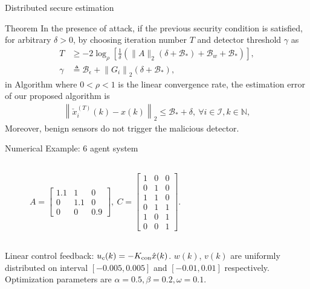 \documentclass[10pt]{beamer}
\newcommand{\Bc}{{\mathcal B}}
\newcommand{\Ica}{{\mathcal I}}
\newcommand{\Nb}{{\mathbb N}}
\newcommand{\cx}{{\check{x}}}
\begin{document}
\begin{frame}{Distributed secure estimation}

	\begin{block}{Theorem}
	In the presence of attack, if the previous security condition is satisfied, for arbitrary $\delta>0$, by choosing iteration number $T$ and detector threshold $\gamma$ as 
	\begin{align}
		T&\geq -2\log_{\rho}\left[ \frac{1}{\delta} \left( \|A\|_2(\delta+\Bc_{*})+\Bc_{w}+ \Bc_{*} \right)\right], \label{eq:chooseT}\\
		\gamma&\triangleq\Bc_\epsilon + \left\|G_i\right\|_2 (\delta+\Bc_{*}), \label{eq:choose_gamma}
	\end{align}
	in Algorithm where $0<\rho<1$ is the linear convergence rate, the estimation error of our proposed algorithm is
	\begin{align*}
		\left\|\cx_i^{(T)}(k)-x(k)\right\|_2 \leq \Bc_{*}+\delta, \ \forall i\in\Ica, k\in\Nb,
	\end{align*}
	Moreover, benign sensors do not trigger the malicious detector.
	
	\end{block}


	
\end{frame}

\begin{frame}{Numerical Example: 6 agent system}
	\begin{columns}
		\begin{column}{0.5\textwidth}
				\begin{align*}
				A=\begin{bmatrix}
					1.1  &   1  &  0\\
					0 & 1.1  &    0\\
					0  &   0  &  0.9
				\end{bmatrix},\  C=
				\begin{bmatrix}
					1 &0& 0\\
					0& 1& 0\\
					1& 1& 0\\
					0 &1& 1\\
					1& 0& 1\\
					0 &0& 1
				\end{bmatrix}.
			\end{align*}
		\end{column}
	\begin{column}{0.5\textwidth}
		\begin{figure}[htpb!]
			\centering
			
		\end{figure}
	\end{column}
	\end{columns}\vspace{20pt}
Linear control feedback: $u_c(k)=-K_{\rm con}\hat{x}(k)$. $w(k)$, $v(k)$ are uniformly distributed on interval $[-0.005,0.005]$ and $[-0.01,0.01]$ respectively. Optimization parameters are $\alpha=0.5,\beta=0.2,\omega=0.1$.
\end{frame}
\end{document}
